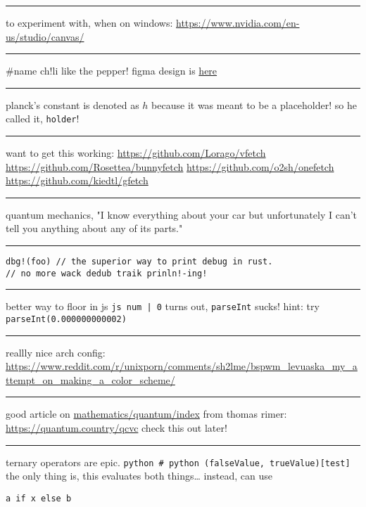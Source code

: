 \documentclass[letterpaper]{article}
\begin{document}
\noindent\rule{\textwidth}{0.5pt}

to experiment with, when on windows:
\url{https://www.nvidia.com/en-us/studio/canvas/}

\noindent\rule{\textwidth}{0.5pt}

\#name ch!li like the pepper! figma design is
\href{https://www.figma.com/file/Z3qcCiUBVYOY8MZwlc6yS1/ch!li?node-id=0\%3A1}{here}

\noindent\rule{\textwidth}{0.5pt}

planck's constant is denoted as \(h\) because it was meant to be a
placeholder! so he called it, \texttt{holder}!

\noindent\rule{\textwidth}{0.5pt}

want to get this working: \url{https://github.com/Lorago/vfetch}
\url{https://github.com/Rosettea/bunnyfetch} \url{https://github.com/o2sh/onefetch}
\url{https://github.com/kiedtl/gfetch}

\noindent\rule{\textwidth}{0.5pt}

quantum mechanics, "I know everything about your car but unfortunately I
can't tell you anything about any of its parts."

\noindent\rule{\textwidth}{0.5pt}

\begin{verbatim}
dbg!(foo) // the superior way to print debug in rust.
// no more wack dedub traik prinln!-ing!
\end{verbatim}

\noindent\rule{\textwidth}{0.5pt}

better way to floor in js \texttt{js num | 0} turns out, \texttt{parseInt} sucks!
hint: try \texttt{parseInt(0.000000000002)}

\noindent\rule{\textwidth}{0.5pt}

reallly nice arch config:
\url{https://www.reddit.com/r/unixporn/comments/sh2lme/bspwm\_levuaska\_my\_attempt\_on\_making\_a\_color\_scheme/}

\noindent\rule{\textwidth}{0.5pt}

good article on
\href{mathematics/quantum/index.org}{mathematics/quantum/index} from
thomas rimer: \url{https://quantum.country/qcvc} check this out later!

\noindent\rule{\textwidth}{0.5pt}

ternary operators are epic.
\texttt{python \# python (falseValue, trueValue)[test]} the only thing is, this
evaluates both things\ldots{} instead, can use

\begin{verbatim}
a if x else b
\end{verbatim}
\end{document}
